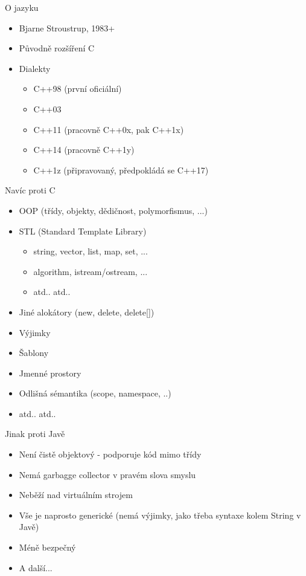 \documentclass{beamer}
\begin{document}
\begin{xframe}{O jazyku}
	\begin{itemize}
		\item Bjarne Stroustrup, 1983+
		\item Původně rozšíření C
		\item Dialekty\begin{itemize}
			\item C++98 (první oficiální)
			\item C++03
			\item C++11 (pracovně C++0x, pak C++1x)
			\item C++14 (pracovně C++1y)
			\item C++1z (připravovaný, předpokládá se C++17)
			\end{itemize}
	\end{itemize}
\end{xframe}

\begin{xframe}{Navíc proti C}
	\begin{itemize}
		\item OOP (třídy, objekty, dědičnost, polymorfismus, ...)
		\item STL (Standard Template Library)
			\begin{itemize}
				\item string, vector, list, map, set, ...
				\item algorithm, istream/ostream, ...
				\item atd.. atd..
			\end{itemize}
		\item Jiné alokátory (new, delete, delete[])
		\item Výjimky
		\item Šablony
		\item Jmenné prostory
		\item Odlišná sémantika (scope, namespace, ..)
		\item atd.. atd..
	\end{itemize}
\end{xframe}

\begin{xframe}{Jinak proti Javě}
	\begin{itemize}
		\item Není čistě objektový - podporuje kód mimo třídy
		\item Nemá garbagge collector v pravém slova smyslu
		\item Neběží nad virtuálním strojem
		\item Vše je naprosto generické (nemá výjimky, jako třeba syntaxe kolem String v Javě)
		\item Méně bezpečný
		\item A další...
	\end{itemize}
\end{xframe}
\end{document}
